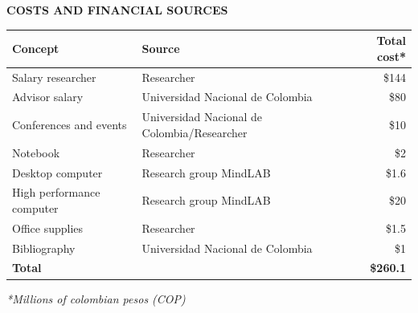 \documentclass[letterpaper,12pt]{article}
\begin{document}
% 
% 
% 
% 
\textbf{COSTS AND FINANCIAL SOURCES}\\
% 
 \begin{table}[!h]
 \centering
 \begin{tabular}{l l r}
 \hline
  \textbf{Concept} & \textbf{Source} & \textbf{Total cost}* \\
  \hline
  Salary researcher & Researcher & \$144 \\
  Advisor salary & Universidad Nacional de Colombia & \$80\\
  Conferences and events & Universidad Nacional de Colombia/Researcher & \$10 \\
  Notebook & Researcher & \$2\\
  Desktop computer & Research group MindLAB & \$1.6\\
  High performance computer & Research group MindLAB & \$20\\
  \hline
  Office supplies & Researcher & \$1.5\\
  Bibliography & Universidad Nacional de Colombia & \$1\\
  \hline
  \textbf{Total} & & \textbf{\$260.1}
 \end{tabular} 
 \end{table}
 \textit{*Millions of colombian pesos (COP)}
% 
% 
% 
% 
%  
%  
% 
% 
% 
% 
\end{document}

